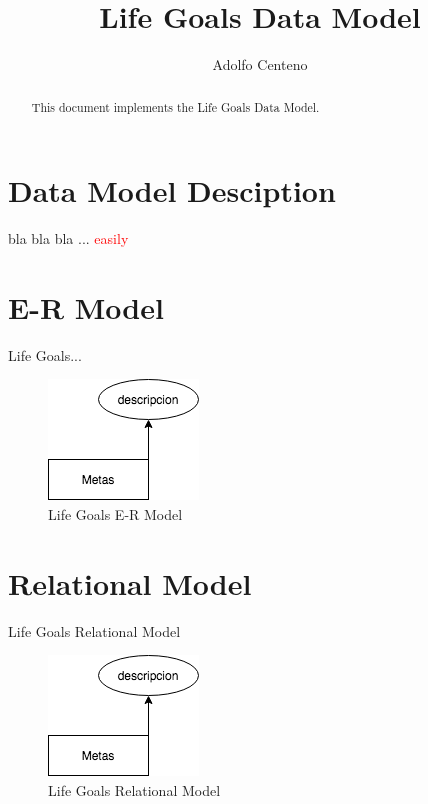 \documentclass[10pt]{article}         %
\title{Life Goals Data Model}
\author{Adolfo Centeno}
\begin{document}
\maketitle

\begin{abstract}
This document implements the Life Goals Data Model.
\end{abstract}

\section{Data Model Desciption}

bla bla bla ...
\textcolor{red}{easily}


\section{E-R Model}

Life Goals...

\begin{figure}[h]
     \includegraphics[scale=0.6]{er_lifegoals}
     \caption{Life Goals E-R Model}
\end{figure}
   
\section{Relational Model}
Life Goals Relational Model

\begin{figure}[h]
     \includegraphics[scale=0.6]{er_lifegoals}
     \caption{Life Goals Relational Model}
\end{figure}
\end{document}
